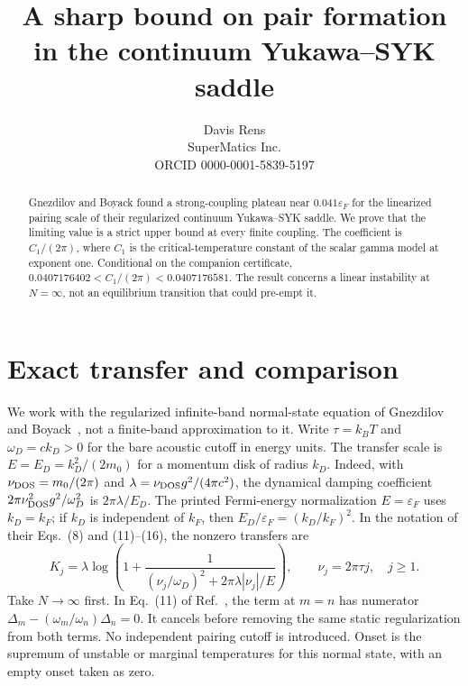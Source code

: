 \documentclass[11pt]{article}
\title{A sharp bound on pair formation in the continuum Yukawa--SYK saddle}
\author{Davis Rens\\SuperMatics Inc.\\ORCID 0000-0001-5839-5197}
\date{}
\begin{document}
\maketitle
\begin{abstract}
Gnezdilov and Boyack found a strong-coupling plateau near $0.041\varepsilon_F$ for the linearized pairing scale of their regularized continuum Yukawa--SYK saddle. We prove that the limiting value is a strict upper bound at every finite coupling. The coefficient is $C_1/(2\pi)$, where $C_1$ is the critical-temperature constant of the scalar gamma model at exponent one. Conditional on the companion certificate, $0.0407176402<C_1/(2\pi)<0.0407176581$. The result concerns a linear instability at $N=\infty$, not an equilibrium transition that could pre-empt it.
\end{abstract}

\section{Exact transfer and comparison}
We work with the regularized infinite-band normal-state equation of Gnezdilov and Boyack~\cite{GB}, not a finite-band approximation to it. Write $\tau=k_BT$ and $\omega_D=ck_D>0$ for the bare acoustic cutoff in energy units. The transfer scale is $E=E_D=k_D^2/(2m_0)$ for a momentum disk of radius $k_D$. Indeed, with $\nu_{\rm DOS}=m_0/(2\pi)$ and $\lambda=\nu_{\rm DOS}g^2/(4\pi c^2)$, the dynamical damping coefficient $2\pi\nu_{\rm DOS}^2g^2/\omega_D^2$ is $2\pi\lambda/E_D$. The printed Fermi-energy normalization $E=\varepsilon_F$ uses $k_D=k_F$; if $k_D$ is independent of $k_F$, then $E_D/\varepsilon_F=(k_D/k_F)^2$. In the notation of their Eqs.~(8) and (11)--(16), the nonzero transfers are
\begin{equation}
 K_j=\lambda\log\!\left(1+\frac{1}{(\nu_j/\omega_D)^2+2\pi\lambda|\nu_j|/E}\right),
 \qquad \nu_j=2\pi\tau j,\quad j\ge1.
 \label{eq:transfer}
\end{equation}
Take $N\to\infty$ first. In Eq.~(11) of Ref.~\cite{GB}, the term at $m=n$ has numerator $\Delta_m-(\omega_m/\omega_n)\Delta_n=0$. It cancels before removing the same static regularization from both terms. No independent pairing cutoff is introduced. Onset is the supremum of unstable or marginal temperatures for this normal state, with an empty onset taken as zero.
\end{document}
